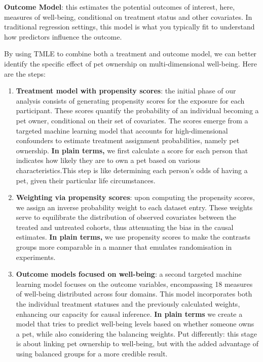 \documentclass[
  singlecolumn,
  9pt]{article}
\begin{document}
\textbf{Outcome Model}: this estimates the potential outcomes of
interest, here, measures of well-being, conditional on treatment status
and other covariates. In traditional regression settings, this model is
what you typically fit to understand how predictors influence the
outcome.

By using TMLE to combine both a treatment and outcome model, we can
better identify the specific effect of pet ownership on
multi-dimensional well-being. Here are the steps:

\begin{enumerate}
\def\labelenumi{\arabic{enumi}.}
\item
  \textbf{Treatment model with propensity scores}: the initial phase of
  our analysis consists of generating propensity scores for the exposure
  for each participant. These scores quantify the probability of an
  individual becoming a pet owner, conditional on their set of
  covariates. The scores emerge from a targeted machine learning model
  that accounts for high-dimensional confounders to estimate treatment
  assignment probabilities, namely pet ownership. \textbf{In plain
  terms,} we first calculate a score for each person that indicates how
  likely they are to own a pet based on various characteristics.This
  step is like determining each person's odds of having a pet, given
  their particular life circumstances.
\item
  \textbf{Weighting via propensity scores}: upon computing the
  propensity scores, we assign an inverse probability weight to each
  dataset entry. These weights serve to equilibrate the distribution of
  observed covariates between the treated and untreated cohorts, thus
  attenuating the bias in the causal estimates. \textbf{In plain terms,}
  we use propensity scores to make the contrasts groups more comparable
  in a manner that emulates randomisation in experiments.
\item
  \textbf{Outcome models focused on well-being}: a second targeted
  machine learning model focuses on the outcome variables, encompassing
  18 measures of well-being distributed across four domains. This model
  incorporates both the individual treatment statuses and the previously
  calculated weights, enhancing our capacity for causal inference.
  \textbf{In plain terms} we create a model that tries to predict
  well-being levels based on whether someone owns a pet, while also
  considering the balancing weights. Put differently: this stage is
  about linking pet ownership to well-being, but with the added
  advantage of using balanced groups for a more credible result.

\end{enumerate}
\end{document}
